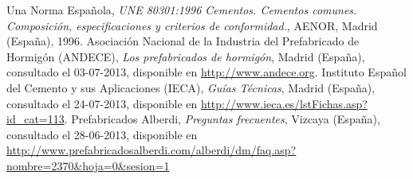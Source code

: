 \begin{thebibliography}{100}
Una Norma Española, \emph{UNE 80301:1996 Cementos. Cementos comunes. Composición, especificaciones y criterios de conformidad.}, AENOR, Madrid (España), 1996.
Asociación Nacional de la Industria del Prefabricado de Hormigón (ANDECE), \emph{Los prefabricados de hormigón}, Madrid (España), consultado el 03-07-2013, disponible en \url{http://www.andece.org}.
Instituto Español del Cemento y sus Aplicaciones (IECA), \emph{Guías Técnicas}, Madrid (España), consultado el 24-07-2013, disponible en \url{http://www.ieca.es/lstFichas.asp?id_cat=113}.
Prefabricados Alberdi, \emph{Preguntas frecuentes}, Vizcaya (España), consultado el 28-06-2013, disponible en \url{http://www.prefabricadosalberdi.com/alberdi/dm/faq.asp?nombre=2370&hoja=0&sesion=1}
\end{thebibliography}
